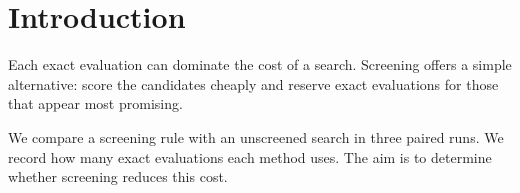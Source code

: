 \documentclass[11pt]{article}
\begin{document}
\section*{Introduction}
Each exact evaluation can dominate the cost of a search. Screening offers a simple alternative: score the candidates cheaply and reserve exact evaluations for those that appear most promising.

We compare a screening rule with an unscreened search in three paired runs. We record how many exact evaluations each method uses. The aim is to determine whether screening reduces this cost.
\end{document}

